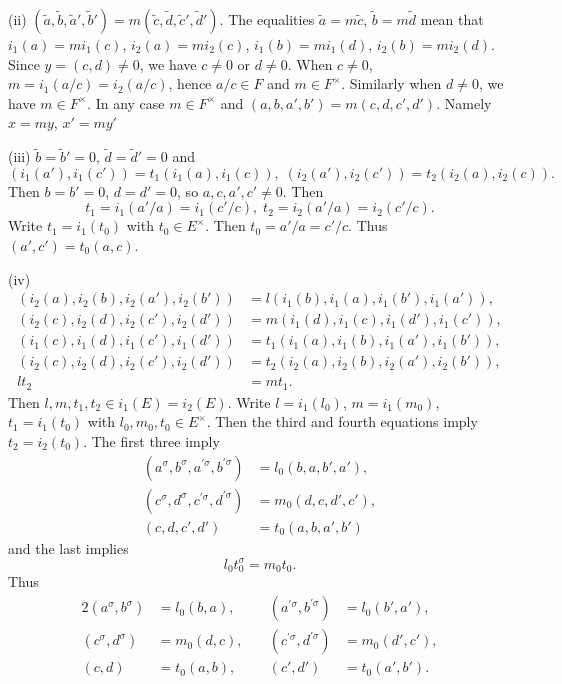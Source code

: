\documentclass{article}
\begin{document}
(ii)
$(\tilde a, \tilde b,\tilde a', \tilde b')=m(\tilde c, \tilde d, \tilde c', \tilde d')$. The equalities
$\tilde a=m \tilde c$, $\tilde b=m \tilde d$ mean that
$i_1(a)=m i_1(c)$, $i_2(a)= m i_2(c)$,  $i_1(b)=m i_1(d)$,  $i_2(b)=m i_2(d)$.
Since $y=(c,d)\ne 0$, we have $c\ne 0$ or $d\ne 0$.
When $c\ne 0$,
$m=i_1(a/c)=i_2(a/c)$,
hence
$a/c\in F$ and $m\in F^{\times}$.
Similarly when $d\ne 0$, we have $m\in F^{\times}$.
In any case $m\in F^{\times}$ and
$(a,b,a',b')=m(c,d,c',d')$.
Namely
$x=m y$, $x'=my'$

(iii)
$\tilde b=\tilde b'=0$, $\tilde d=\tilde d'=0$ and
$$
(i_1(a'), i_1(c'))=t_1(i_1(a), i_1(c)),\; (i_2(a'), i_2(c'))=t_2(i_2(a), i_2(c)).
$$ 
Then $b=b'=0$, $d=d'=0$, 
so $a,c,a',c'\ne 0$. Then
$$
t_1=i_1(a'/a)=i_1(c'/c),\; t_2=i_2(a'/a)=i_2(c'/c).
$$
Write $t_1=i_1(t_0)$ with $t_0\in E^{\times}$. Then
$t_0=a'/a=c'/c$.
Thus
$(a',c')=t_0(a,c)$.

(iv)
\begin{align*}
(i_2(a),i_2(b), i_2(a'),i_2(b'))&=l(i_1(b),i_1(a),i_1(b'),i_1(a')), \\
(i_2(c),i_2(d), i_2(c'),i_2(d'))&=m(i_1(d),i_1(c),i_1(d'),i_1(c')), \\
(i_1(c),i_1(d),i_1(c'),i_1(d'))&=t_1(i_1(a),i_1(b),i_1(a'),i_1(b')), \\
(i_2(c),i_2(d),i_2(c'),i_2(d'))&=t_2(i_2(a),i_2(b),i_2(a'),i_2(b')), \\
lt_2&=mt_1.
\end{align*}
Then $l,m,t_1,t_2\in i_1(E)=i_2(E)$.
Write $l=i_1(l_0)$, $m=i_1(m_0)$, $t_1=i_1(t_0)$ with $l_0,m_0,t_0\in E^{\times}$.
Then the third and fourth equations imply $t_2=i_2(t_0)$. 
The first three imply
\begin{align*}
(a^{\sigma}, b^{\sigma}, a^{\prime\sigma}, b^{\prime\sigma})&=l_0(b,a,b',a'),\\
(c^{\sigma}, d^{\sigma}, c^{\prime\sigma}, d^{\prime\sigma})&=m_0(d,c,d',c'),\\
(c,d,c',d')&=t_0(a,b,a',b')
\end{align*}
and the last  implies
$$
l_0t_0^{\sigma}=m_0t_0.
$$
Thus
\begin{alignat*}{2}
(a^{\sigma}, b^{\sigma})&=l_0(b,a), \quad& 
(a^{\prime\sigma}, b^{\prime\sigma})&=l_0(b',a'),\\
 (c^{\sigma}, d^{\sigma})&=m_0(d,c), \quad&
 (c^{\prime\sigma}, d^{\prime\sigma})&=m_0(d',c'),\\
(c,d)&=t_0(a,b),\quad&
(c',d')&=t_0(a',b').
\end{alignat*}
\end{document}
